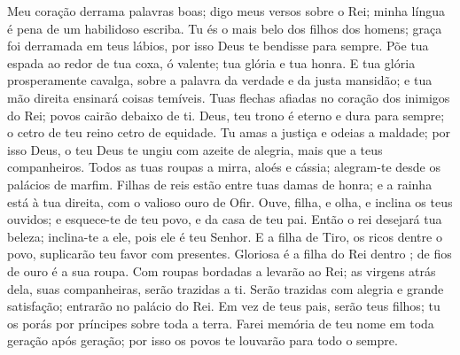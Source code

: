 
{\PP 
  Meu coração derrama palavras boas; digo meus versos sobre o Rei; minha língua é pena de um habilidoso escriba.
  Tu és o mais belo dos filhos dos homens; graça foi derramada em teus lábios, por isso Deus te bendisse para sempre.
  Põe tua espada ao redor de tua coxa, ó valente;
{} tua glória e tua honra.
  E
{} tua glória prosperamente cavalga, sobre a palavra da verdade e da justa mansidão; e tua mão direita ensinará coisas temíveis.
  Tuas flechas
{} afiadas no coração dos inimigos do Rei; povos cairão debaixo de ti.
  Deus, teu trono é eterno e dura para sempre; o cetro de teu reino
{} cetro de equidade.
  Tu amas a justiça e odeias a maldade; por isso Deus, o teu Deus te ungiu com azeite de alegria, mais que a teus companheiros.
  Todos as tuas roupas
{} a mirra, aloés e cássia; alegram-te desde os palácios de marfim.
  Filhas de reis estão entre tuas damas de honra; e a rainha está à tua direita,
{} com o valioso ouro de Ofir.
  Ouve, filha, e olha, e inclina os teus ouvidos; e esquece-te de teu povo, e da casa de teu pai.
  Então o rei desejará tua beleza; inclina-te a ele, pois ele é teu Senhor.
  E a filha de Tiro, os ricos dentre o povo, suplicarão teu favor com presentes.
  Gloriosa é a filha do Rei dentro
{} ; de fios de ouro é a sua roupa.
  Com roupas bordadas a levarão ao Rei; as virgens atrás dela, suas companheiras, serão trazidas a ti.
  Serão trazidas com alegria e grande satisfação; entrarão no palácio do Rei.
  Em vez de teus pais, serão teus filhos; tu os porás por príncipes sobre toda a terra.
  Farei memória de teu nome em toda geração após geração; por isso os povos te louvarão para todo o sempre.
\par }


